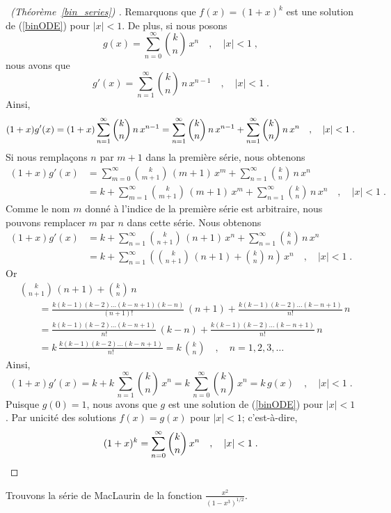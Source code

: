 {\begin{proof}[\UOproof\ (Théorème~\ref{bin_series}) \theory]
Remarquons que $f(x) = (1+x)^k$ est une solution de (\ref{binODE})
pour $|x|<1$.  De plus, si nous posons
\[
g(x) = \sum_{n=0}^\infty \binom{k}{n} \, x^n \quad , \quad |x|<1 \; ,
\]
nous avons que
\[
g'(x) = \sum_{n=1}^\infty \binom{k}{n}\,n \, x^{n-1}
\quad , \quad |x|<1 \; .
\]
Ainsi,
\[
(1+x) g'(x) = (1+x) \sum_{n=1}^\infty \binom{k}{n}\,n \, x^{n-1} \\
= \sum_{n=1}^\infty \binom{k}{n}\,n \, x^{n-1} +
\sum_{n=1}^\infty \binom{k}{n}\,n \, x^n \quad , \quad |x|<1 \; .
\]
Si nous remplaçons $n$ par $m+1$ dans la première série, nous obtenons
\begin{align*}
(1+x) g'(x)
&= \sum_{m=0}^\infty \binom{k}{m+1}\,(m+1) \, x^m +
\sum_{n=1}^\infty \binom{k}{n}\,n \, x^n \\
&= k + \sum_{m=1}^\infty \binom{k}{m+1}\,(m+1) \, x^m +
\sum_{n=1}^\infty \binom{k}{n}\,n \, x^n \quad , \quad |x|<1 \; .
\end{align*}
Comme le nom $m$ donné à l'indice de la première série est arbitraire, nous
pouvons remplacer $m$ par $n$ dans cette série.  Nous obtenons
\begin{align*}
(1+x) g'(x)
&= k + \sum_{n=1}^\infty \binom{k}{n+1}\,(n+1) \, x^n +
\sum_{n=1}^\infty \binom{k}{n}\,n \, x^n \\
&= k + \sum_{n=1}^\infty \left( \binom{k}{n+1}\,(n+1)
+ \binom{k}{n}\,n \right) \, x^n \quad , \quad |x|<1 \; .
\end{align*}
Or
\begin{align*}
& \binom{k}{n+1}\,(n+1) + \binom{k}{n}\,n \\
& \qquad = \frac{k(k-1)(k-2)\ldots(k-n+1)(k-n)}{(n+1)!} \, (n+1)
+ \frac{k(k-1)(k-2)\ldots(k-n+1)}{n!} \, n \\
& \qquad = \frac{k(k-1)(k-2)\ldots(k-n+1)}{n!} \, (k-n) +
\frac{k(k-1)(k-2)\ldots(k-n+1)}{n!} \, n \\
& \qquad = k\,\frac{k(k-1)(k-2)\ldots(k-n+1)}{n!} = k\, \binom{k}{n}
\quad , \quad n=1,2,3,\ldots
\end{align*}
Ainsi,
\[
(1+x) g'(x)
= k + k \,\sum_{n=1}^\infty \binom{k}{n} \, x^n
= k\, \sum_{n=0}^\infty \binom{k}{n} \, x^n
= k\, g(x) \quad , \quad |x|<1 \; .
\]
Puisque $g(0) =1$, nous avons que $g$ est une solution de (\ref{binODE}) pour
$|x|<1$.  Par unicité des solutions $f(x)=g(x)$ pour $|x|<1$; c'est-à-dire,
\[
(1+x)^k = \sum_{n=0}^\infty \binom{k}{n} \, x^n \quad , \quad |x|<1 
\; .   \qedhere
\]
\end{proof}

\begin{egg}
Trouvons la série de MacLaurin de la fonction
$\displaystyle \frac{x^2}{(1-x^3)^{1/2}}$.


\end{egg}}

